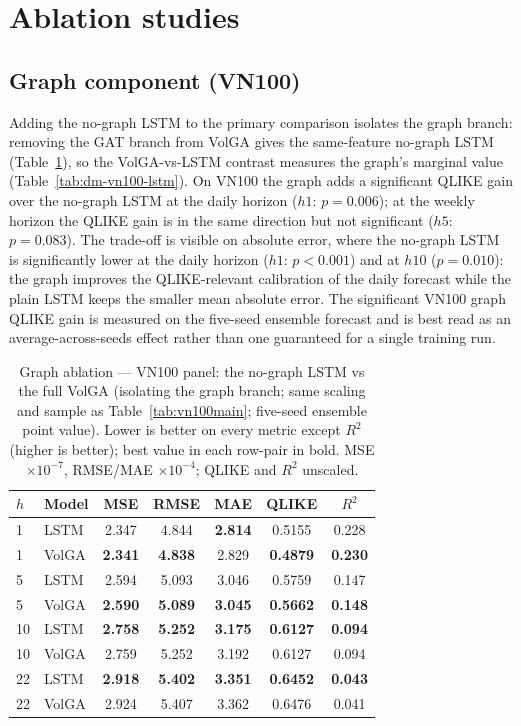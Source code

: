 \documentclass{llncs}
\begin{document}
\FloatBarrier
\section{Ablation studies}\label{sec:abl}
\subsection{Graph component (VN100)}\label{sec:graph}
Adding the no-graph LSTM to the primary comparison isolates the graph branch: removing the GAT branch
from VolGA gives the same-feature no-graph LSTM (Table~\ref{tab:vn100graph}), so the VolGA-vs-LSTM
contrast measures the graph's marginal value (Table~\ref{tab:dm-vn100-lstm}). On VN100 the graph adds
a significant QLIKE gain over the no-graph LSTM at the daily horizon ($h1$: $p=0.006$); at the weekly
horizon the QLIKE gain is in the same direction but not significant ($h5$: $p=0.083$). The trade-off
is visible on absolute error, where the no-graph LSTM is significantly lower at the daily horizon
($h1$: $p<0.001$) and at $h10$ ($p=0.010$): the graph improves the QLIKE-relevant calibration of the
daily forecast while the plain LSTM keeps the smaller mean absolute error. The significant VN100 graph
QLIKE gain is measured on the five-seed ensemble forecast and is best read as an average-across-seeds
effect rather than one guaranteed for a single training run.

\begin{table}[t]
\centering
\caption{Graph ablation --- VN100 panel: the no-graph LSTM vs the full VolGA (isolating the graph
branch; same scaling and sample as Table~\ref{tab:vn100main}; five-seed ensemble point value). Lower
is better on every metric except $R^2$ (higher is better); best value in each row-pair in bold. MSE
$\times10^{-7}$, RMSE/MAE $\times10^{-4}$; QLIKE and $R^2$ unscaled.}
\label{tab:vn100graph}
\footnotesize
\setlength{\tabcolsep}{6pt}
\begin{tabular}{llccccc}
\toprule
$h$ & Model & MSE & RMSE & MAE & QLIKE & $R^2$ \\
\midrule
1 & LSTM & 2.347 & 4.844 & \textbf{2.814} & 0.5155 & 0.228 \\
1 & VolGA & \textbf{2.341} & \textbf{4.838} & 2.829 & \textbf{0.4879} & \textbf{0.230} \\
\midrule
5 & LSTM & 2.594 & 5.093 & 3.046 & 0.5759 & 0.147 \\
5 & VolGA & \textbf{2.590} & \textbf{5.089} & \textbf{3.045} & \textbf{0.5662} & \textbf{0.148} \\
\midrule
10 & LSTM & \textbf{2.758} & \textbf{5.252} & \textbf{3.175} & \textbf{0.6127} & \textbf{0.094} \\
10 & VolGA & 2.759 & 5.252 & 3.192 & 0.6127 & 0.094 \\
\midrule
22 & LSTM & \textbf{2.918} & \textbf{5.402} & \textbf{3.351} & \textbf{0.6452} & \textbf{0.043} \\
22 & VolGA & 2.924 & 5.407 & 3.362 & 0.6476 & 0.041 \\
\bottomrule
\end{tabular}
\end{table}
\end{document}
